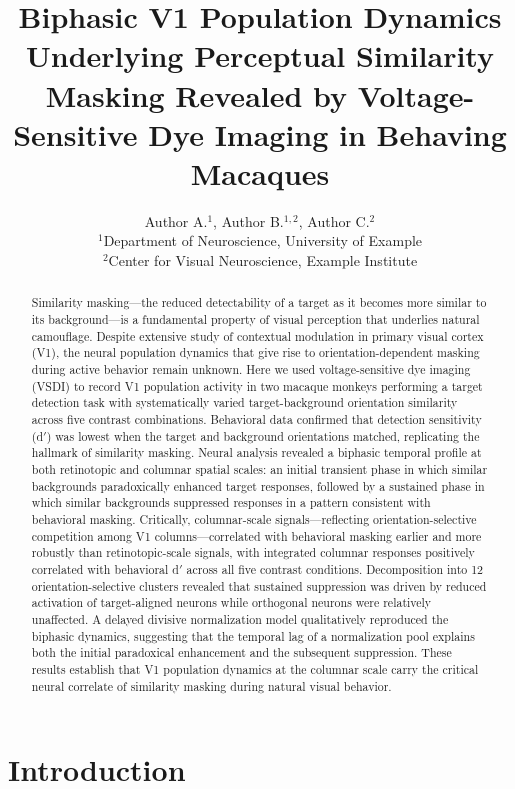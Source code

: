\documentclass[11pt]{article}
\title{Biphasic V1 Population Dynamics Underlying Perceptual Similarity Masking Revealed by Voltage-Sensitive Dye Imaging in Behaving Macaques}
\author{Author A.$^{1}$, Author B.$^{1,2}$, Author C.$^{2}$ \\
\small $^{1}$Department of Neuroscience, University of Example \\
\small $^{2}$Center for Visual Neuroscience, Example Institute}
\date{}
\begin{document}
\maketitle

\begin{abstract}
Similarity masking---the reduced detectability of a target as it becomes more similar to its background---is a fundamental property of visual perception that underlies natural camouflage. Despite extensive study of contextual modulation in primary visual cortex (V1), the neural population dynamics that give rise to orientation-dependent masking during active behavior remain unknown. Here we used voltage-sensitive dye imaging (VSDI) to record V1 population activity in two macaque monkeys performing a target detection task with systematically varied target-background orientation similarity across five contrast combinations. Behavioral data confirmed that detection sensitivity (d$'$) was lowest when the target and background orientations matched, replicating the hallmark of similarity masking. Neural analysis revealed a biphasic temporal profile at both retinotopic and columnar spatial scales: an initial transient phase in which similar backgrounds paradoxically enhanced target responses, followed by a sustained phase in which similar backgrounds suppressed responses in a pattern consistent with behavioral masking. Critically, columnar-scale signals---reflecting orientation-selective competition among V1 columns---correlated with behavioral masking earlier and more robustly than retinotopic-scale signals, with integrated columnar responses positively correlated with behavioral d$'$ across all five contrast conditions. Decomposition into 12 orientation-selective clusters revealed that sustained suppression was driven by reduced activation of target-aligned neurons while orthogonal neurons were relatively unaffected. A delayed divisive normalization model qualitatively reproduced the biphasic dynamics, suggesting that the temporal lag of a normalization pool explains both the initial paradoxical enhancement and the subsequent suppression. These results establish that V1 population dynamics at the columnar scale carry the critical neural correlate of similarity masking during natural visual behavior.
\end{abstract}

\section{Introduction}
\end{document}
